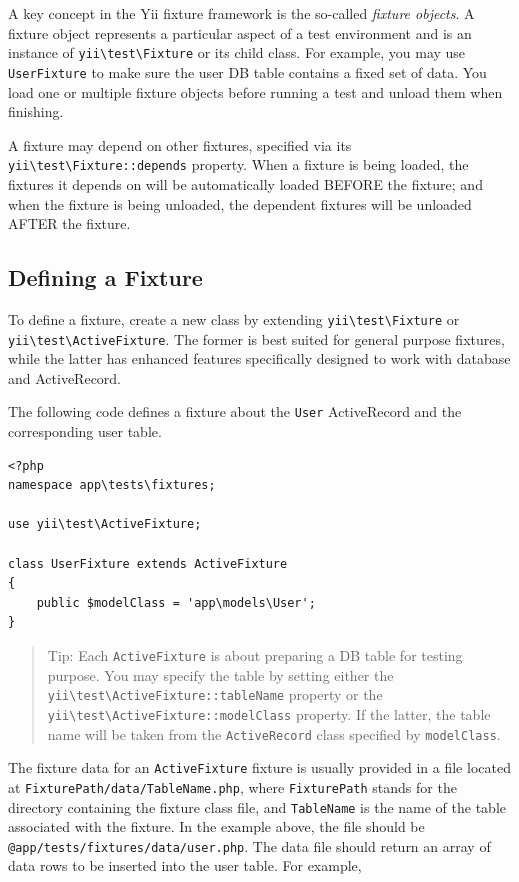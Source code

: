 A key concept in the Yii fixture framework is the so-called \textit{fixture objects}. A fixture object represents
a particular aspect of a test environment and is an instance of \texttt{yii{\allowbreak{}\textbackslash}test{\allowbreak{}\textbackslash}Fixture} or its child class. For example,
you may use \lstinline|UserFixture| to make sure the user DB table contains a fixed set of data. You load one or multiple
fixture objects before running a test and unload them when finishing.

A fixture may depend on other fixtures, specified via its \texttt{yii{\allowbreak{}\textbackslash}test{\allowbreak{}\textbackslash}Fixture\allowbreak{}::\allowbreak{}depends} property.
When a fixture is being loaded, the fixtures it depends on will be automatically loaded BEFORE the fixture;
and when the fixture is being unloaded, the dependent fixtures will be unloaded AFTER the fixture.

\subsection{Defining a Fixture}
To define a fixture, create a new class by extending \texttt{yii{\allowbreak{}\textbackslash}test{\allowbreak{}\textbackslash}Fixture} or \texttt{yii{\allowbreak{}\textbackslash}test{\allowbreak{}\textbackslash}ActiveFixture}.
The former is best suited for general purpose fixtures, while the latter has enhanced features specifically
designed to work with database and ActiveRecord.

The following code defines a fixture about the \lstinline|User| ActiveRecord and the corresponding user table.

\lstset{language=php}\begin{lstlisting}
<?php
namespace app\tests\fixtures;

use yii\test\ActiveFixture;

class UserFixture extends ActiveFixture
{
    public $modelClass = 'app\models\User';
}
\end{lstlisting}
\begin{quote}Tip: Each \lstinline|ActiveFixture| is about preparing a DB table for testing purpose. You may specify the table
by setting either the \texttt{yii{\allowbreak{}\textbackslash}test{\allowbreak{}\textbackslash}ActiveFixture\allowbreak{}::\allowbreak{}tableName} property or the \texttt{yii{\allowbreak{}\textbackslash}test{\allowbreak{}\textbackslash}ActiveFixture\allowbreak{}::\allowbreak{}modelClass}
property. If the latter, the table name will be taken from the \lstinline|ActiveRecord| class specified by \lstinline|modelClass|.

\end{quote}
The fixture data for an \lstinline|ActiveFixture| fixture is usually provided in a file located at \lstinline|FixturePath/data/TableName.php|,
where \lstinline|FixturePath| stands for the directory containing the fixture class file, and \lstinline|TableName|
is the name of the table associated with the fixture. In the example above, the file should be
\lstinline|@app/tests/fixtures/data/user.php|. The data file should return an array of data rows
to be inserted into the user table. For example,

